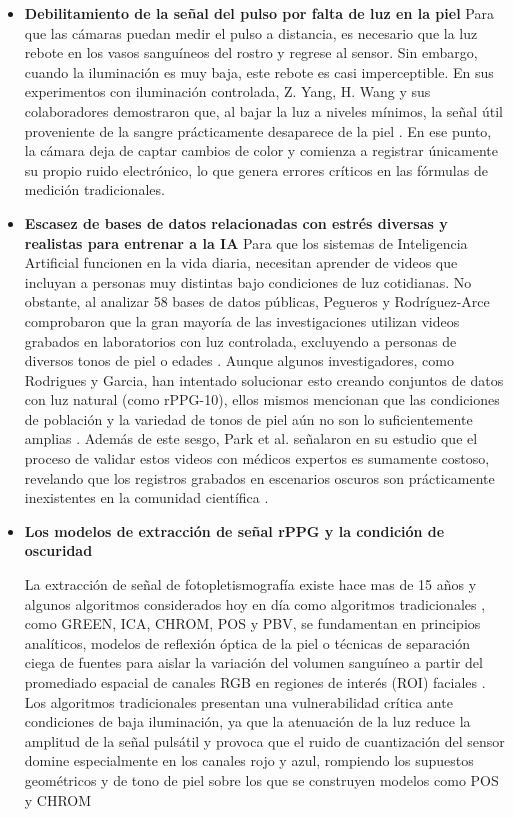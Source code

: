 \begin{itemize}
    \item \textbf{Debilitamiento de la señal del pulso por falta de luz en la piel} Para que las cámaras puedan medir el pulso a distancia, es necesario que la 
    luz rebote en los vasos sanguíneos del rostro y regrese al sensor. Sin embargo, cuando la iluminación es muy baja, este rebote es casi imperceptible. En sus 
    experimentos con iluminación controlada, Z. Yang, H. Wang y sus colaboradores demostraron que, al bajar la luz a niveles mínimos, la señal útil proveniente 
    de la sangre prácticamente desaparece de la piel \cite{yang2022image_en}. En ese punto, la cámara deja de captar cambios de color y comienza a registrar 
    únicamente su propio ruido electrónico, lo que genera errores críticos en las fórmulas de medición tradicionales.

    \item \textbf{Escasez de bases de datos relacionadas con estrés diversas y realistas para entrenar a la IA} Para que los sistemas de Inteligencia Artificial funcionen en la vida 
    diaria, necesitan aprender de videos que incluyan a personas muy distintas bajo condiciones de luz cotidianas. No obstante, al analizar 58 bases de datos 
    públicas, Pegueros y Rodríguez-Arce comprobaron que la gran mayoría de las investigaciones utilizan videos grabados en laboratorios con luz controlada, 
    excluyendo a personas de diversos tonos de piel o edades \cite{rodriguez2025datasets}. Aunque algunos investigadores, como Rodrigues y Garcia, han intentado 
    solucionar esto creando conjuntos de datos con luz natural (como rPPG-10), ellos mismos mencionan que las condiciones de población y la variedad de tonos de 
    piel aún no son lo suficientemente amplias \cite{rodriguez2025datasets}. Además de este sesgo, Park et al. señalaron en su estudio que el proceso de validar 
    estos videos con médicos expertos es sumamente costoso, revelando que los registros grabados en escenarios oscuros son prácticamente inexistentes en la 
    comunidad científica \cite{yu2024rgbnir}.

    \item \textbf{Los modelos de extracción de señal rPPG y la condición de oscuridad} 
    
    La extracción de señal de fotopletismografía existe hace mas de 15 años y algunos algoritmos considerados hoy en día como algoritmos tradicionales \cite{yang2022assessment_dl},
    como GREEN, ICA, CHROM, POS y PBV, se fundamentan en principios analíticos, modelos de reflexión óptica de la piel o técnicas de separación 
    ciega de fuentes para aislar la variación del volumen sanguíneo a partir del promediado espacial de canales RGB en regiones de interés (ROI) faciales \cite{yu2023physformer, xu2023ivrrppg, liang2023selfadaptive, wu2026udarppg}. 
    Los algoritmos tradicionales presentan una vulnerabilidad crítica ante condiciones de baja iluminación, ya que la atenuación de la luz reduce la 
    amplitud de la señal pulsátil y provoca que el ruido de cuantización del sensor domine especialmente en los canales rojo y azul, rompiendo los 
    supuestos geométricos y de tono de piel sobre los que se construyen modelos como POS y CHROM \cite{chen2024image_en, xi2022weighted}



\end{itemize}
